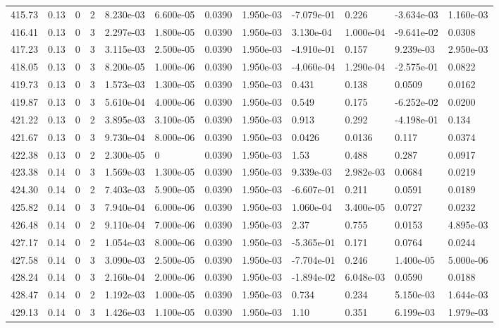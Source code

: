 \documentclass[preview]{standalone}
\begin{document}
{{{{{{{{{{{{{\begin{tabular}{L{1.2cm}C{1.2cm} C{0.3cm}C{0.5cm} C{1.4cm}C{1.4cm} C{1.4cm}C{1.4cm} C{1.6cm}C{1.6cm} C{1.6cm}C{1.6cm}}
  415.73  &  0.13  & 0     &  2 &  8.230e-03  & 6.600e-05  &  0.0390&   1.950e-03& -7.079e-01 & 0.226   &  -3.634e-03 & 1.160e-03  \\ 
  416.41  &  0.13  & 0     &  3 &  2.297e-03  & 1.800e-05  &  0.0390&   1.950e-03& 3.130e-04 & 1.000e-04   &  -9.641e-02 & 0.0308  \\ 
  417.23  &  0.13  & 0     &  3 &  3.115e-03  & 2.500e-05  &  0.0390&   1.950e-03& -4.910e-01 & 0.157   &  9.239e-03 & 2.950e-03  \\ 
  418.05  &  0.13  & 0     &  3 &  8.200e-05  & 1.000e-06  &  0.0390&   1.950e-03& -4.060e-04 & 1.290e-04   &  -2.575e-01 & 0.0822  \\ 
  419.73  &  0.13  & 0     &  3 &  1.573e-03  & 1.300e-05  &  0.0390&   1.950e-03& 0.431 & 0.138   &  0.0509 & 0.0162  \\ 
  419.87  &  0.13  & 0     &  3 &  5.610e-04  & 4.000e-06  &  0.0390&   1.950e-03& 0.549 & 0.175   &  -6.252e-02 & 0.0200  \\ 
  421.22  &  0.13  & 0     &  2 &  3.895e-03  & 3.100e-05  &  0.0390&   1.950e-03& 0.913 & 0.292   &  -4.198e-01 & 0.134  \\ 
  421.67  &  0.13  & 0     &  3 &  9.730e-04  & 8.000e-06  &  0.0390&   1.950e-03& 0.0426 & 0.0136   &  0.117 & 0.0374  \\ 
  422.38  &  0.13  & 0     &  2 &  2.300e-05  & 0  &  0.0390&   1.950e-03& 1.53 & 0.488   &  0.287 & 0.0917  \\ 
  423.38  &  0.14  & 0     &  3 &  1.569e-03  & 1.300e-05  &  0.0390&   1.950e-03& 9.339e-03 & 2.982e-03   &  0.0684 & 0.0219  \\ 
  424.30  &  0.14  & 0     &  2 &  7.403e-03  & 5.900e-05  &  0.0390&   1.950e-03& -6.607e-01 & 0.211   &  0.0591 & 0.0189  \\ 
  425.82  &  0.14  & 0     &  3 &  7.940e-04  & 6.000e-06  &  0.0390&   1.950e-03& 1.060e-04 & 3.400e-05   &  0.0727 & 0.0232  \\ 
  426.48  &  0.14  & 0     &  2 &  9.110e-04  & 7.000e-06  &  0.0390&   1.950e-03& 2.37 & 0.755   &  0.0153 & 4.895e-03  \\ 
  427.17  &  0.14  & 0     &  2 &  1.054e-03  & 8.000e-06  &  0.0390&   1.950e-03& -5.365e-01 & 0.171   &  0.0764 & 0.0244  \\ 
  427.58  &  0.14  & 0     &  3 &  3.090e-03  & 2.500e-05  &  0.0390&   1.950e-03& -7.704e-01 & 0.246   &  1.400e-05 & 5.000e-06  \\ 
  428.24  &  0.14  & 0     &  3 &  2.160e-04  & 2.000e-06  &  0.0390&   1.950e-03& -1.894e-02 & 6.048e-03   &  0.0590 & 0.0188  \\ 
  428.47  &  0.14  & 0     &  2 &  1.192e-03  & 1.000e-05  &  0.0390&   1.950e-03& 0.734 & 0.234   &  5.150e-03 & 1.644e-03  \\ 
  429.13  &  0.14  & 0     &  3 &  1.426e-03  & 1.100e-05  &  0.0390&   1.950e-03& 1.10 & 0.351   &  6.199e-03 & 1.979e-03  \\ 
\hline 
\end{tabular} 

}}}}}}}}}}}}}
\end{document}
